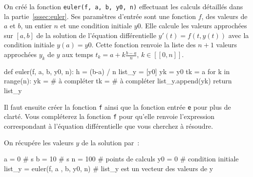 \documentclass[../main/main.tex]{subfiles}
\begin{document}
On créé la fonction \texttt{euler(f, a, b, y0, n)} effectuant les calculs
détaillés dans la partie~\ref{sssec:euler}. Ses paramètres d'entrée sont
une fonction $f$, des valeurs de $a$ et $b$, un entier $n$ et une
condition initiale $y0$. Elle calcule les valeurs approchées sur $[a,b]$ de la
solution de l'équation différentielle $y'(t)=f(t,y(t))$ avec la condition
initiale $y(a)=y0$. Cette fonction renvoie la liste des $n+1$ valeurs
approchées $y_k$ de $y$ aux temps $t_k=a+k \frac{b-a}{n}$, $k\in[\![0,n]\!]$.



  \begin{python}
def euler(f, a, b, y0, n):
  h = (b-a) / n
  list_y = [y0]
  yk = y0
  tk = a
  for k in range(n):
    yk = # à compléter
    tk = # à compléter
    list_y.append(yk)
  return list_y
  \end{python}

Il faut ensuite créer la fonction \texttt{f} ainsi que la fonction entrée
\texttt{e} pour plus de clarté. Vous compléterez la fonction \texttt{f} pour
qu'elle renvoie l'expression correspondant à l'équation différentielle que
vous cherchez à résoudre.

%
%

On récupére les valeurs $y$ de la solution par~:
\begin{python}
a = 0   # s
b = 10  # s
n = 100 # points de calculs
y0 = 0  # condition initiale
list_y = euler(f, a , b, y0, n) # list_y est un vecteur des valeurs de y
\end{python}
\end{document}
